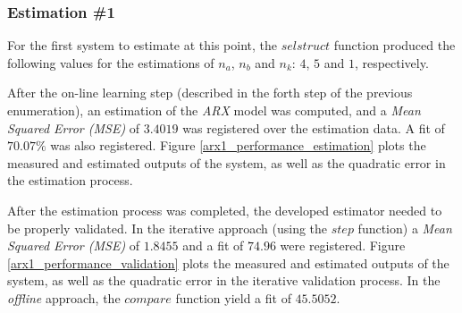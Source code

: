 \documentclass[12pt]{article}
\begin{document}
\subsubsection{Estimation \#1}

For the first system to estimate at this point, the $selstruct$ function produced the following values for the estimations of $n_{a}$, $n_{b}$ and $n_{k}$: $4$, $5$ and $1$, respectively.

After the on-line learning step (described in the forth step of the previous enumeration), an estimation of the \emph{ARX} model was computed, and a \emph{Mean Squared Error (MSE)} of $3.4019$ was registered over the estimation data. A fit of $70.07\%$ was also registered. Figure \ref{arx1_performance_estimation} plots the measured and estimated outputs of the system, as well as the quadratic error in the estimation process.

After the estimation process was completed, the developed estimator needed to be properly validated. In the iterative approach (using the $step$ function) a \emph{Mean Squared Error (MSE)} of $1.8455$ and a fit of $74.96$ were registered. Figure \ref{arx1_performance_validation} plots the measured and estimated outputs of the system, as well as the quadratic error in the iterative validation process. In the \emph{offline} approach, the $compare$ function yield a fit of $45.5052$.
\end{document}
